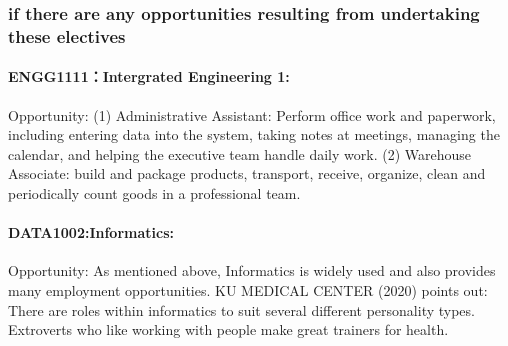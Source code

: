 \documentclass[../draft.tex]{subfiles}
\begin{document}
\subsubsection{if there are any opportunities resulting from undertaking these electives}
\paragraph{ENGG1111：Intergrated Engineering 1:}
Opportunity: (1) Administrative Assistant: Perform office work and paperwork, including entering data into the system, taking notes at meetings, managing the calendar, and helping the executive team handle daily work. (2) Warehouse Associate: build and package products, transport, receive, organize, clean and periodically count goods in a professional team.
\paragraph{DATA1002:Informatics:}
Opportunity: As mentioned above, Informatics is widely used and also provides many employment opportunities. KU MEDICAL CENTER (2020) points out: There are roles within informatics to suit several different personality types. Extroverts who like working with people make great trainers for health.
\end{document}
